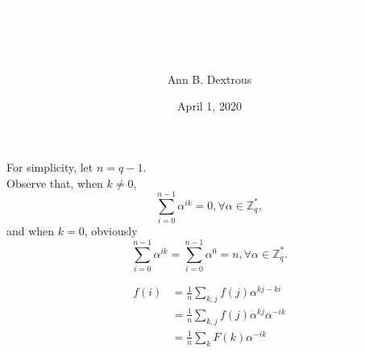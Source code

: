 \documentclass{beamer}	%
\title{\textcolor{white}{How to Get Rid of Ghosts}}
\subtitle{\textcolor{white}{Mathematics Conference for the Mysterious and Magical}}
\author{Ann B. Dextrous}
\date{April 1, 2020}
\newcommand{\Z}{\mathbb{Z}}
\theoremstyle{plain}
\theoremstyle{definition}
\theoremstyle{remark}
\numberwithin{equation}{section}
\begin{document}
\begin{frame}
For simplicity, let $n = q - 1$.\\
Observe that, when $k \ne 0$, 
\[
\sum_{i=0}^{n-1}\alpha^{ik} = 0, \forall \alpha \in \Z_q^*,
\]
and when $k = 0$, obviously
\[
\sum_{i=0}^{n-1}\alpha^{ik} = \sum_{i=0}^{n-1}\alpha^0 = n, \forall \alpha \in \Z_q^*.
\]
\end{frame}

\begin{frame}
\begin{align*}
f(i) & = \frac{1}{n}\sum_{k,j}{f(j)\alpha^{kj-ki}} \\
	 & = \frac{1}{n}\sum_{k,j}{f(j)\alpha^{kj}\alpha^{-ik}} \\
	 & = \frac{1}{n}\sum_{k}{F(k)\alpha^{-ik}}
\end{align*}
\end{frame}
\end{document}
